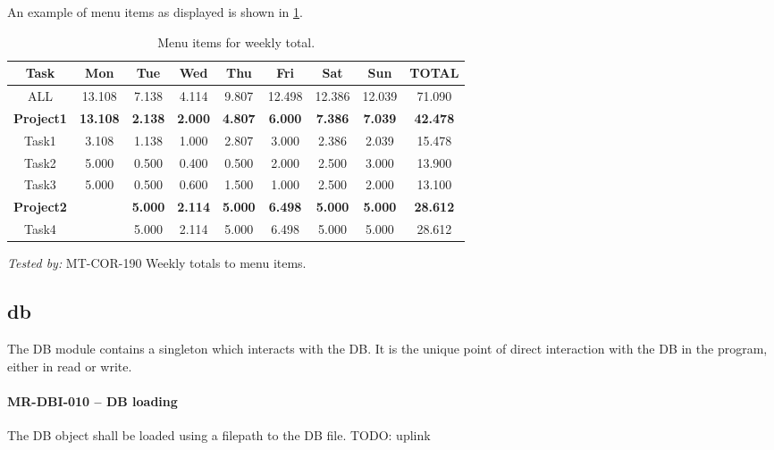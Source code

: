 An example of menu items as displayed is shown in
\cref{tab:weekly_total_menu_items}.

\begin{table} \caption{\label{tab:weekly_total_menu_items} Menu items for
    weekly total.}
  \begin{tabular}{| c | c | c | c | c | c | c | c | c |} \hline
    Task & Mon & Tue & Wed & Thu & Fri & Sat & Sun & TOTAL \\ \hline
    ALL & 13.108 & 7.138 & 4.114 & 9.807
        & 12.498 & 12.386 & 12.039 & 71.090 \\ \hline
    \textbf{Project1} & \textbf{13.108} & \textbf{2.138} & \textbf{2.000}
                      & \textbf{4.807} & \textbf{6.000} & \textbf{7.386}
                      & \textbf{7.039} & \textbf{42.478} \\ \hline
    Task1 & 3.108 & 1.138 & 1.000
          & 2.807 & 3.000 & 2.386
          & 2.039 & 15.478 \\ \hline
    Task2 & 5.000 & 0.500 & 0.400
          & 0.500 & 2.000 & 2.500
          & 3.000 & 13.900 \\ \hline
    Task3 & 5.000 & 0.500 & 0.600
          & 1.500 & 1.000 & 2.500
          & 2.000 & 13.100 \\ \hline
    \textbf{Project2} & & \textbf{5.000} & \textbf{2.114}
                      & \textbf{5.000} & \textbf{6.498} & \textbf{5.000}
                      & \textbf{5.000} & \textbf{28.612} \\ \hline
    Task4 & & 5.000 & 2.114
          & 5.000 & 6.498 & 5.000
          & 5.000 & 28.612 \\ \hline
  \end{tabular}
\end{table}

\textit{Tested by: } MT-COR-190 Weekly totals to menu items.

\subsection{db}
The DB module contains a singleton which interacts with the \gls{DB}.
It is the unique point of direct interaction with the DB in the program,
either in read or write.

\paragraph{MR-DBI-010 -- DB loading}
The DB object shall be loaded using a filepath to the \gls{DB} file.
TODO: uplink

